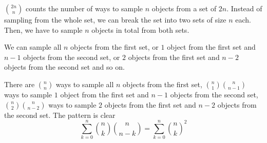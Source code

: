 ${2n \choose n}$ counts the number of ways to sample $n$ objects from a set of $2n$. Instead of sampling from the whole set, we can break the set into two sets of size $n$ each. Then, we have to sample $n$ objects in total from both sets. 

We can sample all $n$ objects from the first set, or $1$ object from the first set and $n-1$ objects from the second set, or $2$ objects from the first set and $n-2$ objects from the second set and so on.

There are ${n \choose n}$ ways to sample all $n$ objects from the first set, ${n \choose 1} {n \choose n-1}$ ways to sample $1$ object from the first set and $n-1$ objects from the second set, ${n \choose 2} {n \choose n-2}$ ways to sample $2$ objects from the first set and $n-2$ objects from the second set. The pattern is clear $$ \sum_{k=0}^{n} {n \choose k} {n \choose n-k} = \sum_{k=0}^{n} {n \choose k}^{2}$$